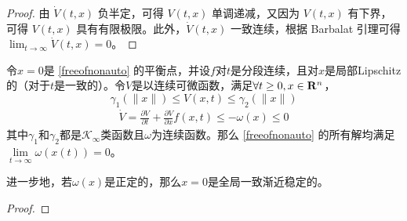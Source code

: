 \begin{proof}
    由 $\dot{V}(t, x)$ 负半定，可得 $V (t, x)$ 单调递减，又因为 $V(t, x)$ 有下界，可得 $V (t, x)$ 具有有限极限。此外，$\dot{V}(t, x)$ 一致连续，根据 Barbalat 引理可得 $\lim_{t \to \infty} \dot{V}(t, x) = 0$。
\end{proof}
\begin{theorem}\label{LaSalle-Yoshizawa}
    令$x=0$是 \eqref{freeofnonauto} 的平衡点，并设$f$对$t$是分段连续，且对$x$是局部Lipschitz的（对于$t$是一致的）。令$V$是以连续可微函数，满足$\forall t\ge 0,x\in\mathbf{R}{}^n$，\[\gamma_1(\|x\|)\le V(x,t)\le \gamma_2(\|x\|)\]
    \[\begin{aligned}\dot{V}=\frac{\partial V}{\partial t}+\frac{\partial V}{\partial x}f(x,t)\leq-\omega(x)\leq0\end{aligned}\]
    其中$\gamma_1$和$\gamma_2$都是$\mathcal{K}_\infty$类函数且$\omega$为连续函数。那么  \eqref{freeofnonauto} 的所有解均满足$\lim\limits_{t\to\infty}\omega(x(t))=0$。
    
    进一步地，若$\omega(x)$是正定的，那么$x=0$是全局一致渐近稳定的。
\end{theorem}
\begin{proof}
    
\end{proof}